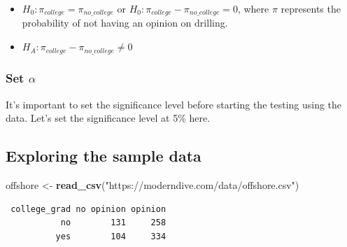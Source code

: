 \documentclass[12pt, krantz2,]{krantz}
\makeatletter
\newenvironment{Shaded}{\begin{snugshade}}{\end{snugshade}}
\newcommand{\DataTypeTok}[1]{\textcolor[rgb]{0.27,0.27,0.27}{#1}}
\newcommand{\KeywordTok}[1]{\textcolor[rgb]{0.27,0.27,0.27}{\textbf{#1}}}
\newcommand{\NormalTok}[1]{#1}
\newcommand{\OperatorTok}[1]{\textcolor[rgb]{0.43,0.43,0.43}{\textbf{#1}}}
\newcommand{\StringTok}[1]{\textcolor[rgb]{0.5,0.5,0.5}{#1}}
\providecommand{\tightlist}{%
  \setlength{\itemsep}{0pt}\setlength{\parskip}{0pt}}
\newenvironment{kframe}{%
\medskip{}
\setlength{\fboxsep}{.8em}
 \def\at@end@of@kframe{}%
 \ifinner\ifhmode%
  \def\at@end@of@kframe{\end{minipage}}%
  \begin{minipage}{\columnwidth}%
 \fi\fi%
 \def\FrameCommand##1{\hskip\@totalleftmargin \hskip-\fboxsep
 \colorbox{shadecolor}{##1}\hskip-\fboxsep
     \hskip-\linewidth \hskip-\@totalleftmargin \hskip\columnwidth}%
 \MakeFramed {\advance\hsize-\width
   \@totalleftmargin\z@ \linewidth\hsize
   \@setminipage}}%
 {\par\unskip\endMakeFramed%
 \at@end@of@kframe}
\renewenvironment{Shaded}{\begin{kframe}}{\end{kframe}}
\makeatother
\begin{document}
\begin{itemize}
\tightlist
\item
  \(H_0: \pi_{college} = \pi_{no\_college}\) or \(H_0: \pi_{college} - \pi_{no\_college} = 0\), where \(\pi\) represents the probability of not having an opinion on drilling.
\item
  \(H_A: \pi_{college} - \pi_{no\_college} \ne 0\)
\end{itemize}

\hypertarget{set-alpha-2}{%
\subsubsection*{\texorpdfstring{Set \(\alpha\)}{Set \textbackslash{}alpha}}\label{set-alpha-2}}


It's important to set the significance level before starting the testing using the data. Let's set the significance level at 5\% here.

\hypertarget{exploring-the-sample-data-2}{%
\subsection{Exploring the sample data}\label{exploring-the-sample-data-2}}

\begin{Shaded}
\begin{Highlighting}[]
\NormalTok{offshore <-}\StringTok{ }\KeywordTok{read_csv}\NormalTok{(}\StringTok{"https://moderndive.com/data/offshore.csv"}\NormalTok{)}
\end{Highlighting}
\end{Shaded}

\begin{Shaded}
\end{Shaded}

\begin{verbatim}
 college_grad no opinion opinion
           no        131     258
          yes        104     334
\end{verbatim}

\begin{Shaded}
\end{Shaded}
\end{document}
